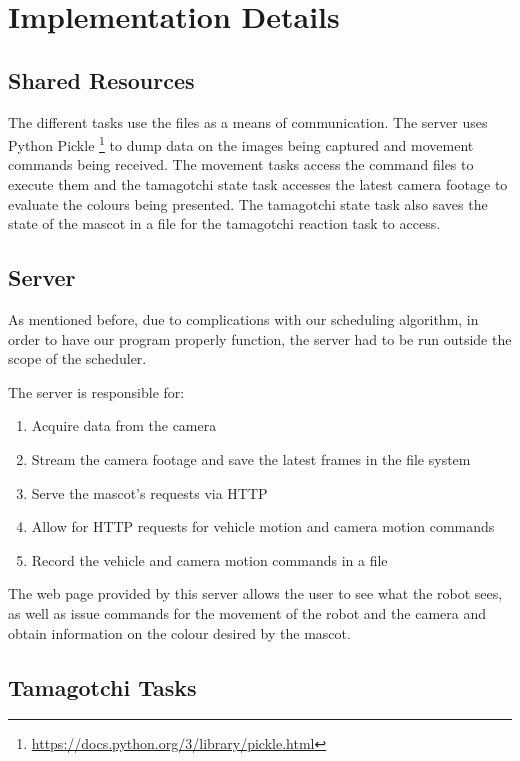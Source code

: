 \documentclass[conference]{IEEEtran}
\begin{document}
\section{Implementation Details}

\subsection{Shared Resources}

The different tasks use the files as a means of communication. The server uses Python Pickle \footnote{\url{https://docs.python.org/3/library/pickle.html}} to dump data on the images being captured and movement commands being received. The movement tasks access the command files to execute them and the tamagotchi state task accesses the latest camera footage to evaluate the colours being presented. The tamagotchi state task also saves the state of the mascot in a file for the tamagotchi reaction task to access.


\subsection{Server}

As mentioned before, due to complications with our scheduling algorithm, in order to have our program properly function, the server had to be run outside the scope of the scheduler. 

The server is responsible for:

\begin{enumerate}
    \item Acquire data from the camera
    \item Stream the camera footage and save the latest frames in the file system
    \item Serve the mascot's requests via HTTP
    \item Allow for HTTP requests for vehicle motion and camera motion commands
    \item Record the vehicle and camera motion commands in a file
\end{enumerate}

The web page provided by this server allows the user to see what the robot sees, as well as issue commands for the movement of the robot and the camera and obtain information on the colour desired by the mascot.

\subsection{Tamagotchi Tasks}
\end{document}
